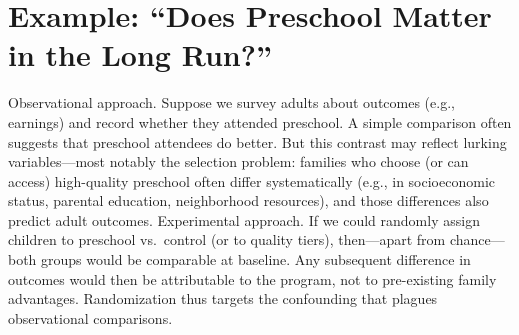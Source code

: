 \documentclass[
  letterpaper,
  DIV=11,
  numbers=noendperiod]{scrreprt}
\begin{document}
\section{Example: ``Does Preschool Matter in the Long
Run?''}\label{example-does-preschool-matter-in-the-long-run-1}

Observational approach. Suppose we survey adults about outcomes (e.g.,
earnings) and record whether they attended preschool. A simple
comparison often suggests that preschool attendees do better. But this
contrast may reflect lurking variables---most notably the selection
problem: families who choose (or can access) high-quality preschool
often differ systematically (e.g., in socioeconomic status, parental
education, neighborhood resources), and those differences also predict
adult outcomes. Experimental approach. If we could randomly assign
children to preschool vs.~control (or to quality tiers), then---apart
from chance---both groups would be comparable at baseline. Any
subsequent difference in outcomes would then be attributable to the
program, not to pre-existing family advantages. Randomization thus
targets the confounding that plagues observational comparisons.
\end{document}
